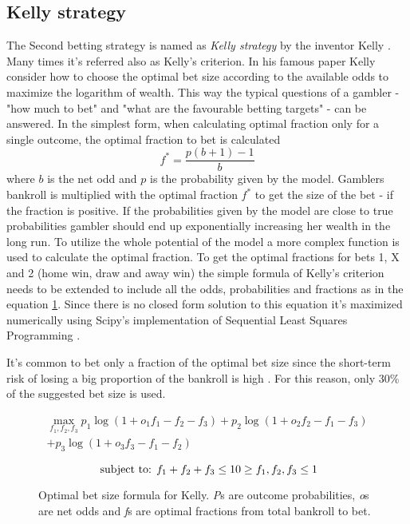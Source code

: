 \subsection{Kelly strategy}
The Second betting strategy is named as \textit{Kelly strategy} by the inventor Kelly \cite{kelly2011new}. Many times it's referred also as Kelly's criterion. In his famous paper \cite{kelly2011new} Kelly consider how to choose the optimal bet size according to the available odds to maximize the logarithm of wealth. This way the typical questions of a gambler - "how much to bet" and "what are the favourable betting targets" -  can be answered. In the simplest form, when calculating optimal fraction only for a single outcome, the optimal fraction to bet is calculated
\begin{equation}
f ^ { * } =  \frac { p ( b + 1 ) - 1 } { b }
\end{equation}
where $b$ is the net odd and $p$ is the probability given by the model. Gamblers bankroll is multiplied with the optimal fraction $f^{*}$ to get the size of the bet - if the fraction is positive. If the probabilities given by the model are close to true probabilities gambler should end up exponentially increasing her wealth in the long run. To utilize the whole potential of the model a more complex function is used to calculate the optimal fraction. To get the optimal fractions for bets 1, X and 2 (home win, draw and away win) the simple formula of Kelly's criterion needs to be extended to include all the odds, probabilities and fractions as in the equation \ref{eq:kelly}. Since there is no closed form solution to this equation it's maximized numerically using Scipy's implementation of Sequential Least Squares Programming \cite{scipy}.

It's common to bet only a fraction of the optimal bet size since the short-term risk of losing a big proportion of the bankroll is high \cite{maclean2011medium}. For this reason, only 30\% of the suggested bet size is used.
\begin{figure}
    \caption{Optimal bet size formula for Kelly. \textit{P}s are outcome probabilities, \textit{o}s are net odds and \textit{f}s are optimal fractions from total bankroll to bet.}
     \begin{equation}
        \begin{split}
            \max_{f_1, f_2, f_3} p_1  \log(1 + o_1 f_1 - f_2 - f_3) + p_2 \log(1 + o_2 f_2 - f_1 - f_3)  \\
            + p_3 \log(1 + o_3 f_3 - f_1 - f_2)
        \end{split}
     \end{equation}

    \begin{equation*}
        \text { subject to: }  f_1 + f_2 + f_3 \leq 1 \\
         0 \geq f_1, f_2, f_3 \leq 1
    \end{equation*}
    \label{eq:kelly}
\end{figure}

